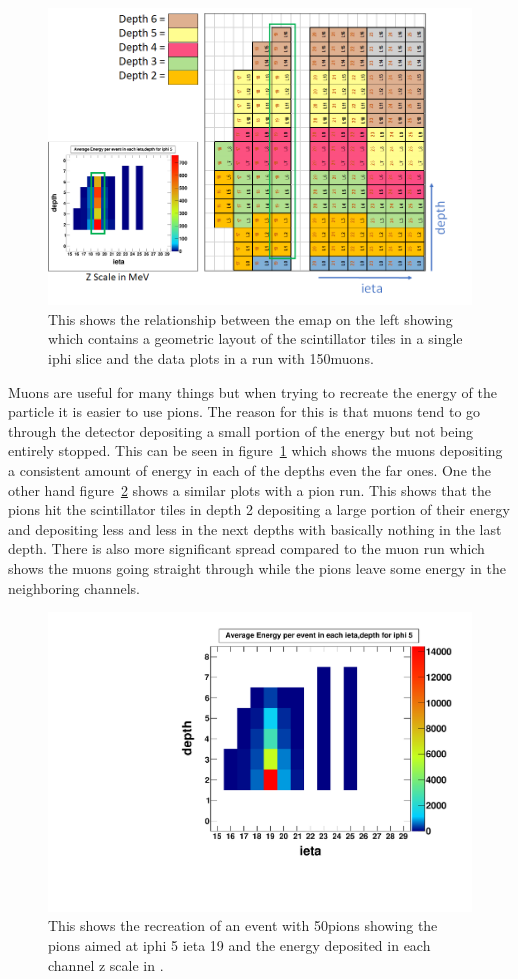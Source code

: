 \begin{figure}
\centering
\includegraphics[width=\linewidth]{Figures/eplot.png}
\caption{This shows the relationship between the emap on the left showing which contains a geometric layout of the scintillator tiles in a single iphi slice and the data plots in a run with 150\GeV muons.}
\label{fig:emap}
\end{figure}

Muons are useful for many things but when trying to recreate the energy of the particle it is easier to use pions. The reason for this is that muons tend to go through the detector depositing a small portion of the energy but not being entirely stopped. This can be seen in figure~\ref{fig:emap} which shows the muons depositing a consistent amount of energy in each of the depths even the far ones. One the other hand figure~\ref{fig:pionmap} shows a similar plots with a pion run. This shows that the pions hit the scintillator tiles in depth 2 depositing a large portion of their energy and depositing less and less in the next depths with basically nothing in the last depth. There is also more significant spread compared to the muon run which shows the muons going straight through while the pions leave some energy in the neighboring channels.

\begin{figure}
\centering
\includegraphics[width=0.7\linewidth]{Figures/pionrun.pdf}
\caption{This shows the recreation of an event with 50\GeV pions showing the pions aimed at iphi 5 ieta 19 and the energy deposited in each channel z scale in \MeV.}
\label{fig:pionmap}
\end{figure}

